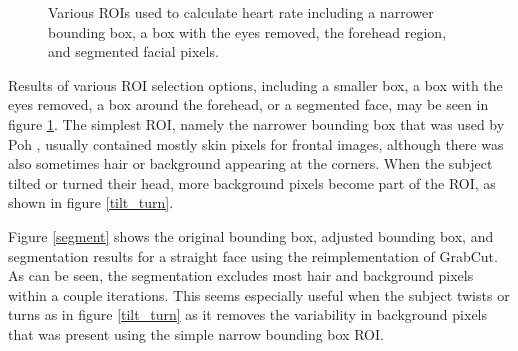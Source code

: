 \documentclass[10pt,twocolumn,letterpaper]{article}
\begin{document}
\begin{figure}
\begin{center}
\end{center}
\caption{Various ROIs used to calculate heart rate including a narrower bounding box, a box with the eyes removed, the forehead region, and segmented facial pixels.}
\label{roi}
\end{figure}

Results of various ROI selection options, including a smaller box, a box with the eyes removed, a box around the forehead, or a segmented face, may be seen in figure \ref{roi}. The simplest ROI, namely the narrower bounding box that was used by Poh \etal, usually contained mostly skin pixels for frontal images, although there was also sometimes hair or background appearing at the corners. When the subject tilted or turned their head, more background pixels become part of the ROI, as shown in figure \ref{tilt_turn}.

Figure \ref{segment} shows the original bounding box, adjusted bounding box, and segmentation results for a straight face using the reimplementation of GrabCut. As can be seen, the segmentation excludes most hair and background pixels within a couple iterations. This seems especially useful when the subject twists or turns as in figure \ref{tilt_turn} as it removes the variability in background pixels that was present using the simple narrow bounding box ROI.
\end{document}
